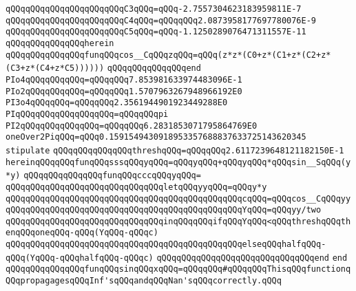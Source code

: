 \verb|qQQqqQQqqQQqqQQqqQQqqQQqC3qQQq=qQQq-2.7557304623183959811E-7|\newline
\verb|qQQqqQQqqQQqqQQqqQQqqQQqC4qQQq=qQQqqQQq2.0873958177697780076E-9|\newline
\verb|qQQqqQQqqQQqqQQqqQQqqQQqC5qQQq=qQQq-1.1250289076471311557E-11|\newline
\verb|qQQqqQQqqQQqqQQqherein|\newline
\verb|qQQqqQQqqQQqqQQqfunqQQqcos__CqQQqzqQQq=qQQq(z*z*(C0+z*(C1+z*(C2+z*(C3+z*(C4+z*C5))))))|\newline
\verb|qQQqqQQqqQQqqQQqend|\newline
\newline
\verb|PIo4qQQqqQQqqQQq=qQQqqQQq7.853981633974483096E-1|\newline
\verb|PIo2qQQqqQQqqQQq=qQQqqQQq1.5707963267948966192E0|\newline
\verb|PI3o4qQQqqQQq=qQQqqQQq2.3561944901923449288E0|\newline
\verb|PIqQQqqQQqqQQqqQQqqQQq=qQQqqQQqpi|\newline
\verb|PI2qQQqqQQqqQQqqQQq=qQQqqQQq6.2831853071795864769E0|\newline
\verb|oneOver2PiqQQq=qQQq0.1591549430918953357688837633725143620345|\newline
\newline
\verb|stipulate|\newline
\verb|qQQqqQQqqQQqqQQqthreshqQQq=qQQqqQQq2.6117239648121182150E-1|\newline
\verb|hereinqQQqqQQqfunqQQqsssqQQqyqQQq=qQQqyqQQq+qQQqyqQQq*qQQqsin__SqQQq(y*y)|\newline
\verb|qQQqqQQqqQQqqQQqfunqQQqcccqQQqyqQQq=|\newline
\verb|qQQqqQQqqQQqqQQqqQQqqQQqqQQqqQQqletqQQqyyqQQq=qQQqy*y|\newline
\verb|qQQqqQQqqQQqqQQqqQQqqQQqqQQqqQQqqQQqqQQqqQQqqQQqcqQQq=qQQqcos__CqQQqyy|\newline
\verb|qQQqqQQqqQQqqQQqqQQqqQQqqQQqqQQqqQQqqQQqqQQqqQQqYqQQq=qQQqyy/two|\newline
\verb|qQQqqQQqqQQqqQQqqQQqqQQqqQQqqQQqinqQQqqQQqifqQQqYqQQq<qQQqthreshqQQqthenqQQqoneqQQq-qQQq(YqQQq-qQQqc)|\newline
\verb|qQQqqQQqqQQqqQQqqQQqqQQqqQQqqQQqqQQqqQQqqQQqqQQqelseqQQqhalfqQQq-qQQq(YqQQq-qQQqhalfqQQq-qQQqc)|\newline
\verb|qQQqqQQqqQQqqQQqqQQqqQQqqQQqqQQqend|\newline
\verb|end|\newline
\verb|qQQqqQQqqQQqqQQqfunqQQqsinqQQqxqQQq=qQQqqQQq#qQQqqQQqThisqQQqfunctionqQQqpropagagesqQQqInf'sqQQqandqQQqNan'sqQQqcorrectly.qQQq|\newline
